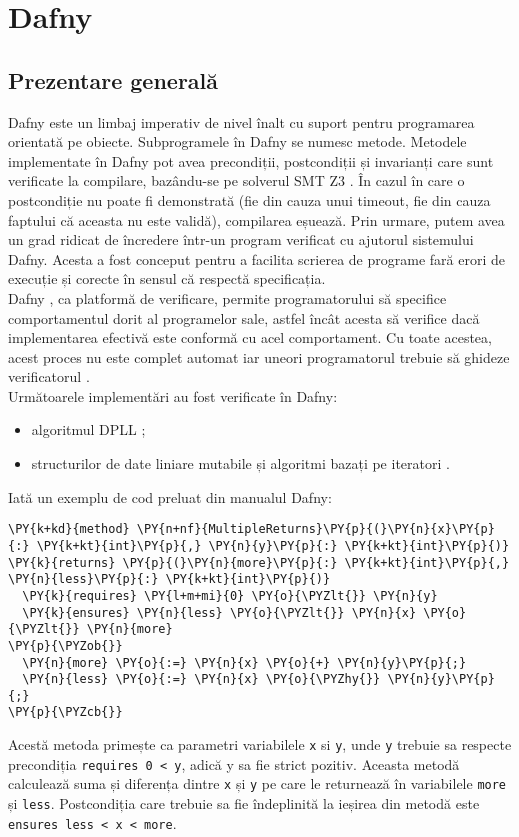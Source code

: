 \chapter{Dafny}
\section{Prezentare generală}

Dafny este un limbaj imperativ de nivel înalt cu suport pentru programarea orientată pe obiecte. Subprogramele în Dafny se numesc metode.  Metodele implementate în Dafny
pot avea precondiții, postcondiții și invarianți care sunt verificate la compilare, bazându-se pe solverul SMT Z3 \citep{DBLP:conf/tacas/MouraB08}. În cazul în care o postcondiție nu poate fi demonstrată (fie din cauza unui timeout, fie din cauza faptului că aceasta nu este validă), compilarea eșuează. Prin urmare, putem avea un grad ridicat de încredere într-un program verificat cu ajutorul sistemului Dafny.
Acesta a fost conceput pentru a facilita scrierea de programe fară erori de execuție și corecte în sensul că respectă specificația.\\
Dafny \citep{dafny-reference-manual}, ca platformă de verificare,  permite programatorului să specifice comportamentul dorit al programelor sale, astfel încât acesta să verifice dacă implementarea efectivă este conformă cu acel comportament. Cu toate acestea, acest proces nu este complet automat iar uneori programatorul trebuie să ghideze verificatorul \citep{dafny-reference-manual}.\\
Următoarele implementări au fost verificate în Dafny:
\begin{itemize}
    \item algoritmul DPLL \citep{DBLP:journals/corr/abs-1909-01743};
    \item structurilor de date liniare mutabile și algoritmi bazați pe iteratori \citep{DBLP:journals/jlap/BlazquezMS23}.
\end{itemize}
Iată un exemplu de cod preluat din manualul Dafny:
\begin{small}
\begin{Verbatim}[commandchars=\\\{\}, fontsize=\footnotesize]
\PY{k+kd}{method} \PY{n+nf}{MultipleReturns}\PY{p}{(}\PY{n}{x}\PY{p}{:} \PY{k+kt}{int}\PY{p}{,} \PY{n}{y}\PY{p}{:} \PY{k+kt}{int}\PY{p}{)} \PY{k}{returns} \PY{p}{(}\PY{n}{more}\PY{p}{:} \PY{k+kt}{int}\PY{p}{,} \PY{n}{less}\PY{p}{:} \PY{k+kt}{int}\PY{p}{)}
  \PY{k}{requires} \PY{l+m+mi}{0} \PY{o}{\PYZlt{}} \PY{n}{y}
  \PY{k}{ensures} \PY{n}{less} \PY{o}{\PYZlt{}} \PY{n}{x} \PY{o}{\PYZlt{}} \PY{n}{more}
\PY{p}{\PYZob{}}
  \PY{n}{more} \PY{o}{:=} \PY{n}{x} \PY{o}{+} \PY{n}{y}\PY{p}{;}
  \PY{n}{less} \PY{o}{:=} \PY{n}{x} \PY{o}{\PYZhy{}} \PY{n}{y}\PY{p}{;}
\PY{p}{\PYZcb{}}
\end{Verbatim}
\end{small}
Acestă metoda primește ca parametri variabilele \texttt{x} si \texttt{y}, unde \texttt{y} trebuie sa respecte precondiția \texttt{requires 0 < y}, adică y sa fie strict pozitiv. Aceasta metodă calculează suma și diferența dintre \texttt{x} și \texttt{y} pe care le returnează în variabilele \texttt{more} și \texttt{less}. Postcondiția care trebuie sa fie îndeplinită la ieșirea din metodă este \texttt{ensures less < x < more}. 